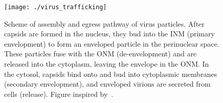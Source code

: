 \begin{landscape}
  \begin{figure}
  \centering
  \texttt{[image: ./virus\_trafficking]}
  \caption[Scheme of assembly and egress pathway of virus particles.]{Scheme of assembly and egress pathway of virus particles.
  After capsids are formed in the nucleus, they bud into the \gls{INM} (primary envelopment) to form an enveloped particle in the perinuclear space.
  These particles fuse with the \gls{ONM} (de-envelopment) and are released into the cytoplasm, leaving the envelope in the \gls{ONM}.
  In the cytosol, capsids bind onto and bud into cytoplasmic membranes (secondary envelopment), and enveloped virions are secreted from cells (release).
  Figure inspired by~\cite{johnsonHerpesvirusesRemodelHost2011}.}\label{fig:viral_egress}
  \end{figure}
\end{landscape}

